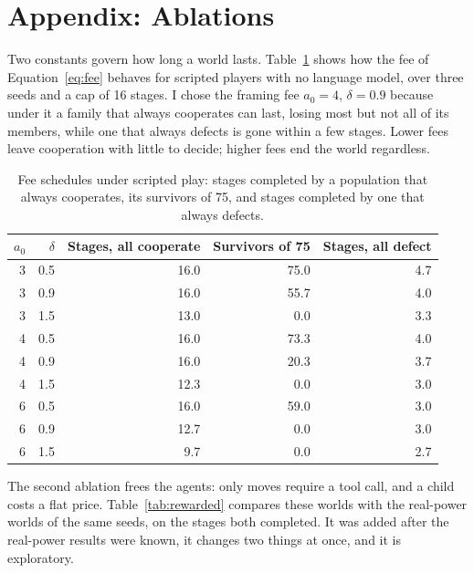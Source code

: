 \section*{Appendix: Ablations}
Two constants govern how long a world lasts. Table~\ref{tab:ablations} shows how the fee of Equation~\ref{eq:fee} behaves for scripted players with no language
model, over three seeds and a cap of 16 stages. I chose the framing fee $a_0 = 4$, $\delta = 0.9$ because under it a family that always cooperates can last, losing most but not all of its members,
while one that always defects is gone within a few stages. Lower fees leave cooperation with little to decide; higher fees end the world regardless.

\begin{table}[!htbp]
\centering
\caption{Fee schedules under scripted play: stages completed by a population that always cooperates, its survivors of 75, and stages completed by one that always defects.}
\label{tab:ablations}
\footnotesize
\begin{tabular}{@{}rrrrr@{}}
\toprule
$a_0$ & $\delta$ & Stages, all cooperate & Survivors of 75 & Stages, all defect \\
\midrule
3 & 0.5 & 16.0 & 75.0 & 4.7 \\
3 & 0.9 & 16.0 & 55.7 & 4.0 \\
3 & 1.5 & 13.0 & 0.0 & 3.3 \\
4 & 0.5 & 16.0 & 73.3 & 4.0 \\
4 & 0.9 & 16.0 & 20.3 & 3.7 \\
4 & 1.5 & 12.3 & 0.0 & 3.0 \\
6 & 0.5 & 16.0 & 59.0 & 3.0 \\
6 & 0.9 & 12.7 & 0.0 & 3.0 \\
6 & 1.5 & 9.7 & 0.0 & 2.7 \\
\bottomrule
\end{tabular}
\end{table}

The second ablation frees the agents: only moves require a tool call, and a child costs a flat price. Table~\ref{tab:rewarded} compares these worlds with the real-power worlds of the same seeds, on the stages both completed. It was added after the real-power results were known, it changes two things at once, and it is exploratory.

